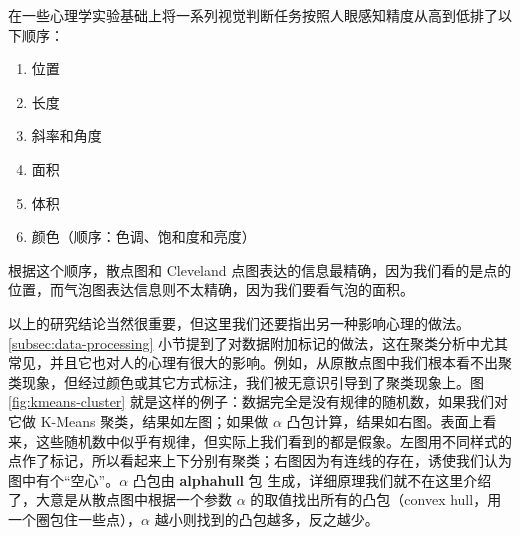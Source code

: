 \documentclass[
  b5paper,
  UTF8,twoside]{book}
\newenvironment{Shaded}{\begin{snugshade}}{\end{snugshade}}
\newcommand{\AttributeTok}[1]{\textcolor[rgb]{0.13,0.29,0.53}{#1}}
\newcommand{\DecValTok}[1]{\textcolor[rgb]{0.00,0.00,0.81}{#1}}
\newcommand{\FloatTok}[1]{\textcolor[rgb]{0.00,0.00,0.81}{#1}}
\newcommand{\FunctionTok}[1]{\textcolor[rgb]{0.13,0.29,0.53}{\textbf{#1}}}
\newcommand{\NormalTok}[1]{#1}
\newcommand{\OtherTok}[1]{\textcolor[rgb]{0.56,0.35,0.01}{#1}}
\newcommand{\SpecialCharTok}[1]{\textcolor[rgb]{0.81,0.36,0.00}{\textbf{#1}}}
\providecommand{\tightlist}{%
  \setlength{\itemsep}{0pt}\setlength{\parskip}{0pt}}
\begin{document}
\citet{Cleveland85} 在一些心理学实验基础上将一系列视觉判断任务按照人眼感知精度从高到低排了以下顺序：

\begin{enumerate}
\def\labelenumi{\arabic{enumi}.}
\tightlist
\item
  位置
\item
  长度
\item
  斜率和角度
\item
  面积
\item
  体积
\item
  颜色（顺序：色调、饱和度和亮度）
\end{enumerate}

根据这个顺序，散点图和 Cleveland 点图表达的信息最精确，因为我们看的是点的位置，而气泡图表达信息则不太精确，因为我们要看气泡的面积。

以上的研究结论当然很重要，但这里我们还要指出另一种影响心理的做法。\ref{subsec:data-processing} 小节提到了对数据附加标记的做法，这在聚类分析中尤其常见，并且它也对人的心理有很大的影响。例如，从原散点图中我们根本看不出聚类现象，但经过颜色或其它方式标注，我们被无意识引导到了聚类现象上。图 \ref{fig:kmeans-cluster} 就是这样的例子：数据完全是没有规律的随机数，如果我们对它做 K-Means 聚类，结果如左图；如果做 \(\alpha\) 凸包计算，结果如右图。表面上看来，这些随机数中似乎有规律，但实际上我们看到的都是假象。左图用不同样式的点作了标记，所以看起来上下分别有聚类；右图因为有连线的存在，诱使我们认为图中有个``空心''。\(\alpha\) 凸包由 \textbf{alphahull} 包 \citep{alphahull} 生成，详细原理我们就不在这里介绍了，大意是从散点图中根据一个参数 \(\alpha\) 的取值找出所有的凸包（convex hull，用一个圈包住一些点），\(\alpha\) 越小则找到的凸包越多，反之越少。

\begin{Shaded}
\end{Shaded}
\end{document}
